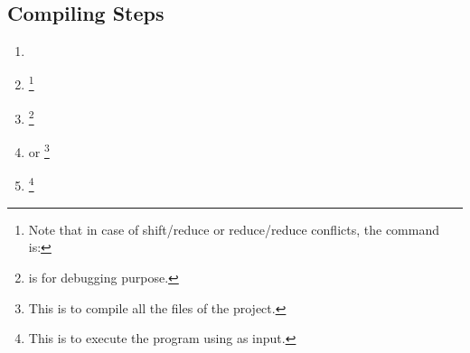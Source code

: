 \subsection{Compiling Steps}
\begin{enumerate}
    \item
    \item
    \footnote{Note that in case of shift/reduce or reduce/reduce conflicts, the command is: }
    \item
    \footnote{ is for debugging purpose.}
    \item
     or \footnote{This is to compile all the files of the project.}
    \item
    \footnote{This is to execute the program using  as input.}
\end{enumerate}